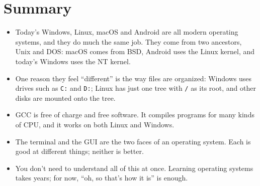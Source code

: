 \section{Summary}

\begin{itemize}
  \item Today's Windows, Linux, macOS and Android are all modern operating systems, and they do much the same job. They come from two ancestors, Unix and DOS: macOS comes from BSD, Android uses the Linux kernel, and today's Windows uses the NT kernel.
  \item One reason they feel ``different'' is the way files are organized: Windows uses drives such as \texttt{C:} and \texttt{D:}; Linux has just one tree with \texttt{/} as its root, and other disks are mounted onto the tree.
  \item GCC is free of charge and free software. It compiles programs for many kinds of CPU, and it works on both Linux and Windows.
  \item The terminal and the GUI are the two faces of an operating system. Each is good at different things; neither is better.
  \item You don't need to understand all of this at once. Learning operating systems takes years; for now, ``oh, so that's how it is'' is enough.
\end{itemize}
